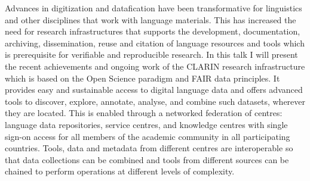 Advances in digitization and datafication have been transformative for linguistics and other disciplines that work with language materials.
This has increased the need for research infrastructures that supports the development, documentation, archiving, dissemination, reuse and citation of language resources and tools which is prerequisite for verifiable and reproducible research.
In this talk I will present the recent achievements and ongoing work of the CLARIN research infrastructure which is based on the Open Science paradigm and FAIR data principles.
It provides easy and sustainable access to digital language data and offers advanced tools to discover, explore, annotate, analyse, and combine such datasets, wherever they are located.
This is enabled through a networked federation of centres: language data repositories, service centres, and knowledge centres with single sign-on access for all members of the academic community in all participating countries.
Tools, data and metadata from different centres are interoperable so that data collections can be combined and tools from different sources can be chained to perform operations at different levels of complexity.